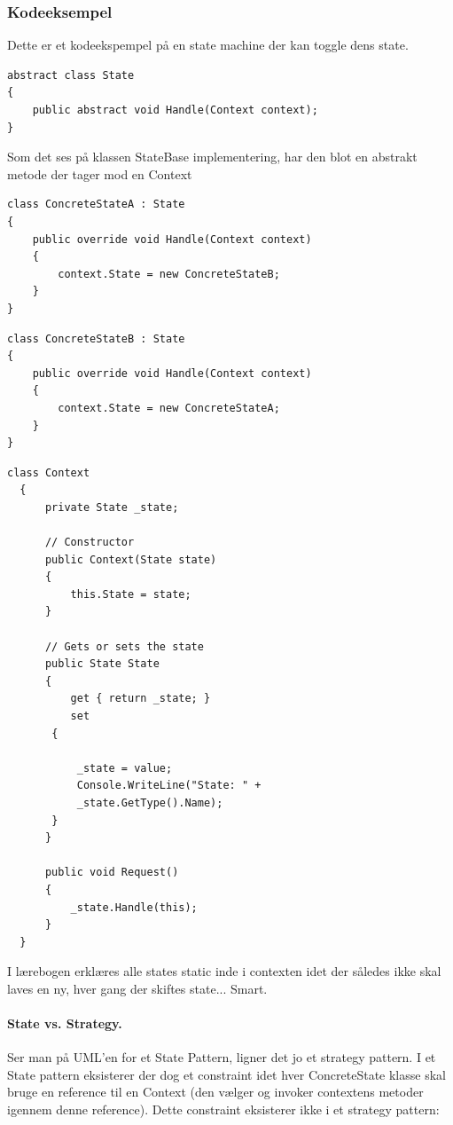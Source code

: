 \subsubsection{Kodeeksempel}

Dette er et kodeekspempel på en state machine der kan toggle dens state.

\begin{lstlisting}[caption=StateBase klassen]
abstract class State
{
	public abstract void Handle(Context context);
}
\end{lstlisting}

Som det ses på klassen StateBase implementering, har den blot en abstrakt metode der tager mod en Context

\begin{lstlisting}[caption=ConcreteStateA klassen - Switcher til State B]
class ConcreteStateA : State
{
	public override void Handle(Context context)
	{
		context.State = new ConcreteStateB;
	}
}
\end{lstlisting}

\begin{lstlisting}[caption=StateBase klassen - Switcher til state A]
class ConcreteStateB : State
{
	public override void Handle(Context context)
	{
		context.State = new ConcreteStateA;
	}
}
\end{lstlisting}


\begin{lstlisting}[caption=Context klassen - Bruges i main() til at kalde Request()]
  class Context
  {
	  private State _state;
  
	  // Constructor
	  public Context(State state)
	  {
		  this.State = state;
	  }
  
	  // Gets or sets the state
	  public State State
	  {
		  get { return _state; }
		  set
	   {
	  
		   _state = value;
		   Console.WriteLine("State: " +
		   _state.GetType().Name);
	   }
	  }
  
	  public void Request()
	  {
		  _state.Handle(this);
	  }
  }
\end{lstlisting}
\newpage

I lærebogen erklæres alle states static inde i contexten idet der således ikke skal laves en ny, hver gang der skiftes state... Smart.

\paragraph{State vs. Strategy.}
Ser man på UML'en for et State Pattern, ligner det jo et strategy pattern. I et State  pattern eksisterer der dog et constraint idet hver ConcreteState klasse skal bruge en reference til en Context (den vælger og invoker contextens metoder igennem denne reference). Dette constraint eksisterer ikke i et strategy pattern:

